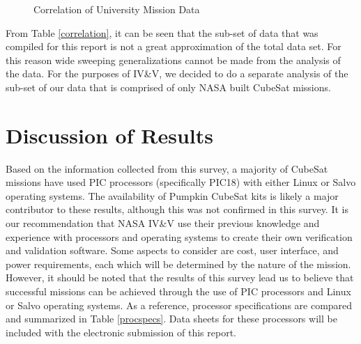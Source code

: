 \documentclass[11pt]{article}
\begin{document}
\begin{figure}[ht!]
\centering
{}
\caption{Correlation of University Mission Data}
\label{university}
\end{figure}

From Table \ref{correlation}, it can be seen that the sub-set of data that was compiled for this report is not a great approximation of the total data set.  For this reason wide sweeping generalizations cannot be made from the analysis of the data. For the purposes of IV\&V, we decided to do a separate analysis of the sub-set of our data that is comprised of only NASA built CubeSat missions. 

\section{Discussion of Results}
Based on the information collected from this survey, a majority of CubeSat missions have used PIC processors (specifically PIC18) with either Linux or Salvo operating systems.  The availability of Pumpkin CubeSat kits is likely a major contributor to these results, although this was not confirmed in this survey.  It is our recommendation that NASA IV\&V use their previous knowledge and experience with processors and operating systems to create their own verification and validation software.  Some aspects to consider are cost, user interface, and power requirements, each which will be determined by the nature of the mission.  However, it should be noted that the results of this survey lead us to believe that successful missions can be achieved through the use of PIC processors and Linux or Salvo operating systems.  As a reference, processor specifications are compared and summarized in Table \ref{procspecs}.  Data sheets for these processors will be included with the electronic submission of this report.
\end{document}
